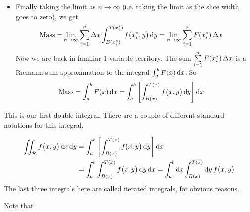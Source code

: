 \begin{itemize}
\item
Finally taking the limit as $n \to \infty$ (i.e. taking the limit as the slice 
width goes to zero), we get
\begin{align*}
\text{Mass}
&=\lim_{n\rightarrow\infty}\sum_{i=1}^n  
\Delta x \int_{B(x_i^*)}^{T(x_i^*)} f\big(x_i^*,y\big)\,\mathrm{d}y
= \lim_{n\rightarrow\infty}\sum_{i=1}^n  F(x_i^*)\,\Delta x  
\end{align*}
Now we are back in familiar 1-variable territory. The sum 
$\sum\limits_{i=1}^n  F(x_i^*)\,\Delta x$ is a Riemann sum approximation
to the integral $ \int_a^b F(x)\,\mathrm{d}x$. So
\begin{align*}
\text{Mass}
&= \int_a^b F(x)\,\mathrm{d}x
=\int_a^b \left[\int_{B(x)}^{T(x)} f\big(x,y\big)\,\mathrm{d}y\right]\mathrm{d}x 
\end{align*}
\end{itemize}
This is our first double integral. There are a couple of different standard
notations for this integral.
\begin{notn}\label{notn dbl int}
\begin{align*}
\iint_{\mathcal{R}} f\big(x,y\big)\,\mathrm{d}x\,\mathrm{d}y
&= \int_a^b \left[\int_{B(x)}^{T(x)} f\big(x,y\big)\,\mathrm{d}y\right]\mathrm{d}x \\
&=\int_a^b \int_{B(x)}^{T(x)} f\big(x,y\big)\,\mathrm{d}y\,\mathrm{d}x
=\int_a^b \mathrm{d}x \int_{B(x)}^{T(x)} \mathrm{d}y\, f\big(x,y\big)
\end{align*}
The last three integrals here are called iterated integrals, 
for obvious reasons.
\end{notn}
Note that
